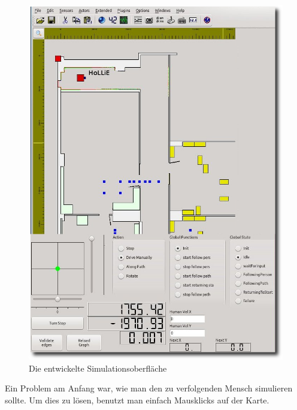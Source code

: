\begin{figure}[h]
\centering
\includegraphics[scale=0.4]{graphics/mcagui_screenshot.png}		
\caption{\label{fig:mcagui} Die entwickelte Simulationsoberfläche
}
\end{figure}

Ein Problem am Anfang war, wie man den zu verfolgenden Mensch simulieren sollte. Um dies zu lösen, benutzt man einfach Mausklicks auf der Karte.
